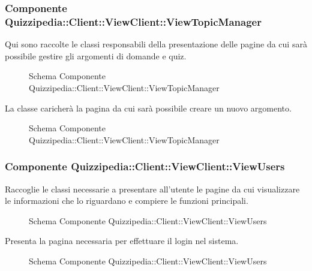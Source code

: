 \subsubsection{Componente Quizzipedia::Client::ViewClient::ViewTopicManager}
Qui sono raccolte le classi responsabili della presentazione delle pagine da cui sarà possibile gestire gli argomenti di domande e quiz.
\begin{figure}[H]
\centering
\noindent{}
\caption{Schema Componente Quizzipedia::Client::ViewClient::ViewTopicManager}
\end{figure}
La classe caricherà la pagina da cui sarà possibile creare un nuovo argomento.
\begin{figure}[H]
\centering
\noindent{}
\caption{Schema Componente Quizzipedia::Client::ViewClient::ViewTopicManager}
\end{figure}
\subsubsection{Componente Quizzipedia::Client::ViewClient::ViewUsers}
Raccoglie le classi necessarie a presentare all'utente le pagine da cui visualizzare le informazioni che lo riguardano e compiere le funzioni principali.
\begin{figure}[H]
\centering
\noindent{}
\caption{Schema Componente Quizzipedia::Client::ViewClient::ViewUsers}
\end{figure}
Presenta la pagina necessaria per effettuare il login nel sistema.
\begin{figure}[H]
\centering
\noindent{}
\caption{Schema Componente Quizzipedia::Client::ViewClient::ViewUsers}
\end{figure}
